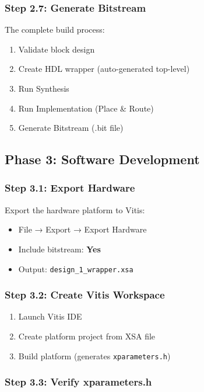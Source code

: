 \documentclass[11pt,a4paper]{article}
\begin{document}
\subsubsection{Step 2.7: Generate Bitstream}

The complete build process:
\begin{enumerate}
    \item Validate block design
    \item Create HDL wrapper (auto-generated top-level)
    \item Run Synthesis
    \item Run Implementation (Place \& Route)
    \item Generate Bitstream (.bit file)
\end{enumerate}

\subsection{Phase 3: Software Development}

\subsubsection{Step 3.1: Export Hardware}

Export the hardware platform to Vitis:
\begin{itemize}
    \item File → Export → Export Hardware
    \item Include bitstream: \textbf{Yes}
    \item Output: \texttt{design\_1\_wrapper.xsa}
\end{itemize}

\subsubsection{Step 3.2: Create Vitis Workspace}

\begin{enumerate}
    \item Launch Vitis IDE
    \item Create platform project from XSA file
    \item Build platform (generates \texttt{xparameters.h})
\end{enumerate}

\subsubsection{Step 3.3: Verify xparameters.h}
\end{document}
